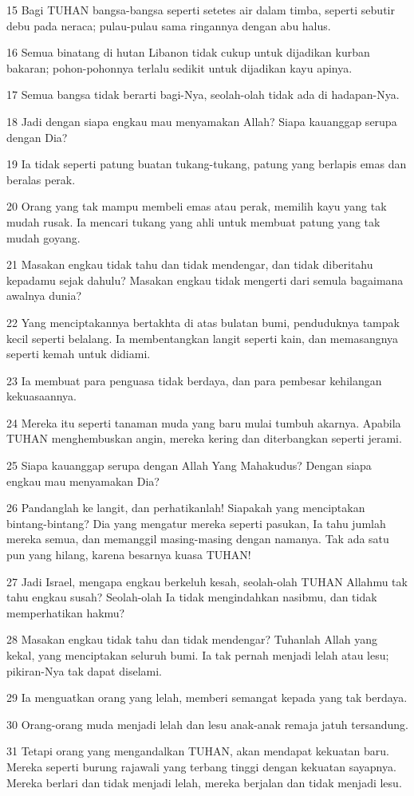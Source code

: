 \par 15 Bagi TUHAN bangsa-bangsa seperti setetes air dalam timba, seperti sebutir debu pada neraca; pulau-pulau sama ringannya dengan abu halus.
\par 16 Semua binatang di hutan Libanon tidak cukup untuk dijadikan kurban bakaran; pohon-pohonnya terlalu sedikit untuk dijadikan kayu apinya.
\par 17 Semua bangsa tidak berarti bagi-Nya, seolah-olah tidak ada di hadapan-Nya.
\par 18 Jadi dengan siapa engkau mau menyamakan Allah? Siapa kauanggap serupa dengan Dia?
\par 19 Ia tidak seperti patung buatan tukang-tukang, patung yang berlapis emas dan beralas perak.
\par 20 Orang yang tak mampu membeli emas atau perak, memilih kayu yang tak mudah rusak. Ia mencari tukang yang ahli untuk membuat patung yang tak mudah goyang.
\par 21 Masakan engkau tidak tahu dan tidak mendengar, dan tidak diberitahu kepadamu sejak dahulu? Masakan engkau tidak mengerti dari semula bagaimana awalnya dunia?
\par 22 Yang menciptakannya bertakhta di atas bulatan bumi, penduduknya tampak kecil seperti belalang. Ia membentangkan langit seperti kain, dan memasangnya seperti kemah untuk didiami.
\par 23 Ia membuat para penguasa tidak berdaya, dan para pembesar kehilangan kekuasaannya.
\par 24 Mereka itu seperti tanaman muda yang baru mulai tumbuh akarnya. Apabila TUHAN menghembuskan angin, mereka kering dan diterbangkan seperti jerami.
\par 25 Siapa kauanggap serupa dengan Allah Yang Mahakudus? Dengan siapa engkau mau menyamakan Dia?
\par 26 Pandanglah ke langit, dan perhatikanlah! Siapakah yang menciptakan bintang-bintang? Dia yang mengatur mereka seperti pasukan, Ia tahu jumlah mereka semua, dan memanggil masing-masing dengan namanya. Tak ada satu pun yang hilang, karena besarnya kuasa TUHAN!
\par 27 Jadi Israel, mengapa engkau berkeluh kesah, seolah-olah TUHAN Allahmu tak tahu engkau susah? Seolah-olah Ia tidak mengindahkan nasibmu, dan tidak memperhatikan hakmu?
\par 28 Masakan engkau tidak tahu dan tidak mendengar? Tuhanlah Allah yang kekal, yang menciptakan seluruh bumi. Ia tak pernah menjadi lelah atau lesu; pikiran-Nya tak dapat diselami.
\par 29 Ia menguatkan orang yang lelah, memberi semangat kepada yang tak berdaya.
\par 30 Orang-orang muda menjadi lelah dan lesu anak-anak remaja jatuh tersandung.
\par 31 Tetapi orang yang mengandalkan TUHAN, akan mendapat kekuatan baru. Mereka seperti burung rajawali yang terbang tinggi dengan kekuatan sayapnya. Mereka berlari dan tidak menjadi lelah, mereka berjalan dan tidak menjadi lesu.

